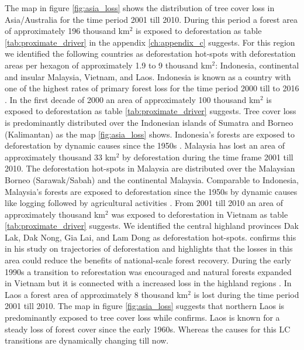 			The map in figure \ref{fig:asia_loss} shows the distribution of tree cover loss in Asia/Australia for the time period 2001 till 2010. During this period a forest area of approximately 196 thousand km$^2$ is exposed to deforestation as table \ref{tab:proximate_driver} in the appendix \ref{ch:appendix_c} suggests. For this region we identified the following countries as deforestation hot-spots with deforestation areas per hexagon of approximately 1.9 to 9 thousand km$^2$: Indonesia, continental and insular Malaysia, Vietnam, and Laos. Indonesia is known as a country with one of the highest rates of primary forest loss for the time period 2000 till to 2016 \citep{Austin2019}. In the first decade of 2000 an area of approximately 100 thousand km$^2$ is exposed to deforestation as table \ref{tab:proximate_driver} suggests. Tree cover loss is predominantly distributed over the Indonesian islands of Sumatra and Borneo (Kalimantan) as the map \ref{fig:asia_loss} shows. Indonesia's forests are exposed to deforestation by dynamic causes since the 1950s \citep{Nawir2007}. Malaysia has lost an area of approximately thousand 33 km$^2$ by deforestation during the time frame 2001 till 2010. The deforestation hot-spots in Malaysia are distributed over the Malaysian Borneo (Sarawak/Sabah) and the continental Malaysia. Comparable to Indonesia, Malaysia's forests are exposed to deforestation since the 1950s by dynamic causes like logging followed by agricultural activities \citep{Kummer1994}. From 2001 till 2010 an area of approximately thousand km$^2$ was exposed to deforestation in Vietnam as table \ref{tab:proximate_driver} suggests. We identified the central highland provinces Dak Lak, Dak Nong, Gia Lai, and Lam Dong as deforestation hot-spots. \citet{Meyfroidt2013} confirms this in his study on trajectories of deforestation and highlights that the losses in this area could reduce the benefits of national-scale forest recovery. During the early 1990s a transition to reforestation was encouraged and natural forests expanded in Vietnam but it is connected with a increased loss in the highland regions \citep{Meyfroidt2013,Chazdon2008}. In Laos a forest area of approximately 8 thousand km$^2$ is lost during the time period 2001 till 2010. The map in figure \ref{fig:asia_loss} suggests that northern Laos is predominantly exposed to tree cover loss while \citet{Hirsch2000} confirms. Laos is known for a steady loss of forest cover since the early 1960s. Whereas the causes for this \ac{LC} transitions are dynamically changing till now.
